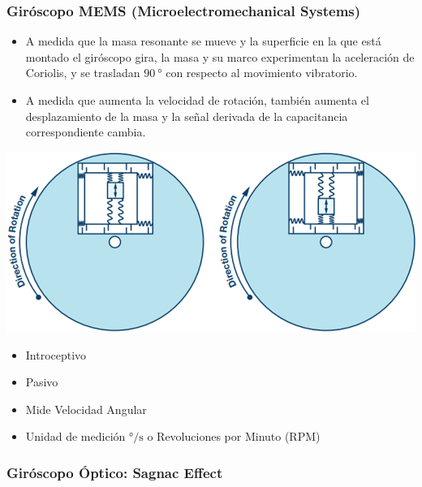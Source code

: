 \begin{frame}
    \frametitle{Giróscopo MEMS (Microelectromechanical Systems)}
    \scriptsize
        
    \begin{itemize}
        \item A medida que la masa resonante se mueve y la superficie en la que está montado el giróscopo gira, la masa y su marco experimentan la aceleración de Coriolis, y se trasladan $\SI{90}{\degree}$ con respecto al movimiento vibratorio.
        
        \item A medida que aumenta la velocidad de rotación, también aumenta el desplazamiento de la masa y la señal derivada de la capacitancia correspondiente cambia.
    \end{itemize}
    
    \begin{center}
        \includegraphics[width=0.5\columnwidth]{images/gyroscope_mems_3.png}
    \end{center}
    
    \begin{itemize}
        \item Introceptivo
        \item Pasivo
        \item Mide Velocidad Angular
        \item Unidad de medición $\si{\degree\per\second}$ o Revoluciones por Minuto (RPM)
    \end{itemize}

\end{frame}

\begin{frame}
    \frametitle{Giróscopo Óptico: Sagnac Effect}
    \scriptsize
    
    
\end{frame}


